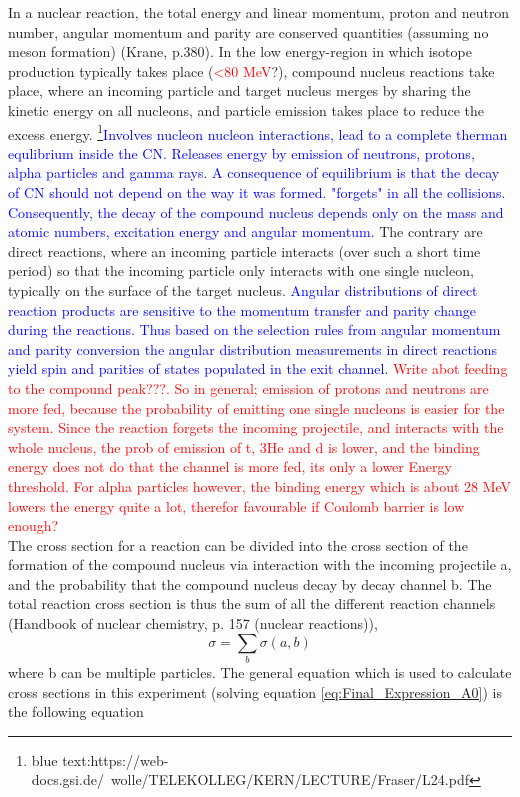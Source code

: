 \documentclass[a4paper,11pt,twoside]{book}
\begin{document}
In a nuclear reaction, the total energy and linear momentum, proton and neutron number, angular momentum and parity are conserved quantities (assuming no meson formation) (Krane, p.380). In the low energy-region in which isotope production typically takes place (\textcolor{red}{<80 MeV}?), compound nucleus reactions take place, where an incoming particle and target nucleus merges by sharing the kinetic energy on all nucleons, and particle emission takes place to reduce the excess energy. \textcolor{blue}{\footnote{blue text:https://web-docs.gsi.de/~wolle/TELEKOLLEG/KERN/LECTURE/Fraser/L24.pdf }Involves nucleon nucleon interactions, lead to a complete therman equlibrium inside the CN. Releases energy by emission of neutrons, protons, alpha particles and gamma rays. A consequence of equilibrium is that the decay of CN should not depend on the way it was formed. "forgets" in all the collisions. Consequently, the decay of the compound nucleus depends only on the mass and atomic numbers, excitation energy and angular momentum.} The contrary are direct reactions, where an incoming particle interacts (over such a short time period) so that the incoming particle only interacts with one single nucleon, typically on the surface of the target nucleus. \textcolor{blue}{Angular distributions of direct reaction products are sensitive to the momentum transfer and parity change during the reactions. Thus based on the selection rules from angular momentum and parity conversion the angular distribution measurements in direct reactions yield spin and parities of states populated in the exit channel}. \textcolor{red}{Write abot feeding to the compound peak???. So in general; emission of protons and neutrons are more fed, because the probability of emitting one single nucleons is easier for the system. Since the reaction forgets the incoming projectile, and interacts with the whole nucleus, the prob of emission of t, 3He and d is lower, and the binding energy does not do that the channel is more fed, its only a lower Energy threshold. For alpha particles however, the binding energy which is about 28 MeV lowers the energy quite a lot, therefor favourable if Coulomb barrier is low enough?} \\


\noindent 
The cross section for a reaction can be divided into the cross section of the formation of the compound nucleus via interaction with the incoming projectile a, and the probability that the compound nucleus decay by decay channel b. The total reaction cross section is thus the sum of all the different reaction channels (Handbook of nuclear chemistry, p. 157 (nuclear reactions)), 
\begin{equation}
    \sigma = \sum_b \sigma(a,b)
\end{equation}
where b can be multiple particles. The general equation which is used to calculate cross sections in this experiment (solving equation \ref{eq:Final_Expression_A0}) is the following equation 
\end{document}
